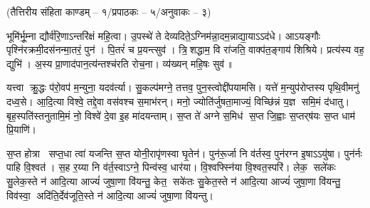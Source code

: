 \centerline{\normalsize (तैत्तिरीय संहिता काण्डम् – १/प्रपाठकः – ५/अनुवाकः – ३)}

भूमि॑र्भू॒म्ना द्यौर्व॑रि॒णाऽन्तरि॑क्षं महि॒त्वा। उ॒पस्थे॑ ते देव्यदिते॒ऽग्नि\-म॑न्ना॒दम॒न्नाद्या॒याऽऽद॑धे।
आऽयङ्गौः पृश्नि॑रक्रमी॒\-दस॑नन्मा॒तरं॒ पुन॑। पि॒तरं॑ च प्र॒यन्त्सुव॑।
त्रि॒शद्धाम॒ वि रा॑जति॒ वाक्प॑त॒ङ्गाय॑ शिश्रिये। प्रत्य॑स्य वह॒ द्युभि॑। अ॒स्य प्रा॒णाद॑पान॒त्य॑न्तश्च॑रति रोच॒ना।
व्य॑ख्यन् महि॒षः सुव॑॥

यत्त्वा क्रु॒द्धः प॑रो॒वप॑ म॒न्युना॒ यदव॑र्त्या। सु॒कल्प॑मग्ने॒ तत्तव॒ पुन॒स्त्वोद्दी॑पयामसि।
यत्ते॑ म॒न्युप॑रोप्तस्य पृथि॒वीमनु॑ दध्व॒से। आ॒दि॒त्या विश्वे॒ तद्दे॒वा वस॑वश्च स॒माभ॑रन्।
मनो॒ ज्योति॑र्जुषता॒माज्यं॒ विच्छि॑न्नं य॒ज्ञ समि॒मं द॑धातु। बृह॒स्पति॑स्तनुतामि॒मं नो॒ विश्वे॑ दे॒वा इ॒ह मा॑दयन्ताम्।
 स॒प्त ते॑ अग्ने स॒मिध॑ स॒प्त जि॒ह्वाः स॒प्तर्‌ष॑यः स॒प्त धाम॑ प्रि॒याणि॑। 

स॒प्त होत्रा सप्त॒धा त्वा॑ यजन्ति स॒प्त योनी॒रापृ॑णस्वा घृ॒तेन॑। पुन॑रू॒र्जा नि व॑र्तस्व॒ पुन॑रग्न इ॒षाऽऽयु॑षा। पुन॑र्नः पाहि वि॒श्वत॑। स॒ह र॒य्या नि व॑र्त॒स्वाऽग्ने॒ पिन्व॑स्व॒ धार॑या। वि॒श्वफ्स्नि॑या वि॒श्वत॒स्परि॑। लेक॒ सले॑कः सु॒लेक॒स्ते न॑ आदि॒त्या आज्यं॑ जुषा॒णा वि॑यन्तु॒ केत॒ सके॑तः सु॒केत॒स्ते न॑ आदि॒त्या आज्यं॑ जुषा॒णा वि॑यन्तु॒ विव॑स्वा॒ अदि॑ति॒र्देव॑जूति॒स्ते न॑ आदि॒त्या आज्यं॑ जुषा॒णा वि॑यन्तु।

